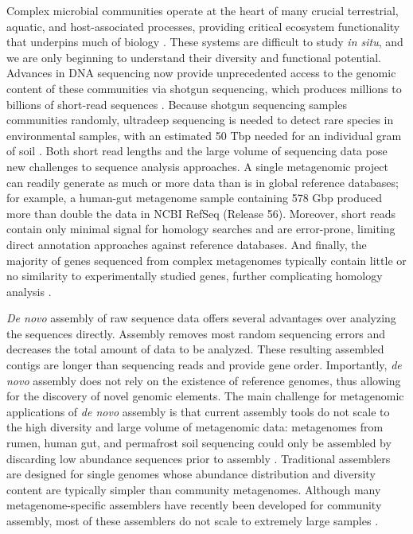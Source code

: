 \documentclass{nature}%
\begin{document}
Complex microbial communities operate at the heart of many crucial
terrestrial, aquatic, and host-associated processes, providing
critical ecosystem functionality that underpins much of biology
\cite{Arumugam:2011p735,Hess:2011p686,Iverson:2012p1281,
  Mackelprang:2011p1087,Qin:2010p189,Tringe:2005p174,Venter:2004p170}.
These systems are difficult to study {\em in situ}, and we are only
beginning to understand their diversity and functional potential.
Advances in DNA sequencing now provide unprecedented
access to the genomic content of these communities via shotgun
sequencing, which produces millions to billions of short-read
sequences \cite{Hess:2011p686,Mackelprang:2011p1087,Qin:2010p189}.
Because shotgun sequencing samples communities randomly, ultradeep
sequencing is needed to detect rare species in environmental samples,
with an estimated 50 Tbp needed for an individual gram of soil
\cite{Gans:2005p1365}.  Both short read lengths and the large volume
of sequencing data pose new challenges to sequence analysis
approaches.  A single metagenomic project can readily generate as much
or more data than is in global reference databases; for example, a
human-gut metagenome sample containing 578 Gbp \cite{Qin:2010p189}
produced more than double the data in NCBI RefSeq
(Release 56).  Moreover, short reads contain only minimal
signal for homology searches and are error-prone, limiting direct
annotation approaches against reference databases.  And finally, the
majority of genes sequenced from complex metagenomes typically contain little or no
similarity to experimentally studied genes, further complicating
homology analysis \cite{Arumugam:2011p735,Qin:2010p189}.

\emph{De novo} assembly of raw sequence data offers several advantages
over analyzing the sequences directly.  Assembly removes most random
sequencing errors and decreases the total amount of data to be
analyzed.  These resulting assembled contigs are longer than
sequencing reads and provide gene order.  Importantly, \emph{de novo}
assembly does not rely on the existence of reference genomes, thus
allowing for the discovery of novel genomic elements.  The main challenge for
metagenomic applications of \emph{de novo} assembly is that current
assembly tools do not scale to the high diversity and large volume of metagenomic data: metagenomes from rumen, human gut, and permafrost
soil sequencing could only be assembled by discarding low abundance
sequences prior to assembly
\cite{Hess:2011p686,Mackelprang:2011p1087,Qin:2010p189}.  Traditional
assemblers are designed for single genomes whose abundance
distribution and diversity content are typically simpler than
community metagenomes.  Although many metagenome-specific assemblers
have recently been developed for community assembly, most of these assemblers
do not scale to extremely large samples \cite{Scholz:2012p1372}.
\end{document}

